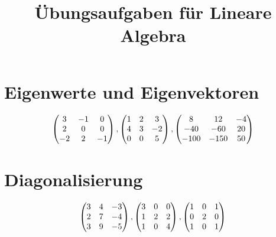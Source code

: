 \documentclass[ngerman,a4paper]{article}
\title{\textbf{\"Ubungsaufgaben f\"ur Lineare Algebra}}
\author{}
\date{}
\begin{document}
\maketitle

\renewcommand{\arraystretch}{1.5}

\section{Eigenwerte und Eigenvektoren}
\begin{align}
	\begin{pmatrix}
		3 & -1 & 0 \\ 2 & 0 & 0 \\ -2 & 2 & -1
	\end{pmatrix},
	\begin{pmatrix}
		1 & 2 & 3 \\ 4 & 3 & -2 \\ 0 & 0 & 5
	\end{pmatrix},
	\begin{pmatrix}
		8 & 12 & -4 \\ -40 & -60 & 20 \\ -100 & -150 & 50
	\end{pmatrix}\notag
\end{align}

\section{Diagonalisierung}
\begin{align}
	\begin{pmatrix}
		3 & 4 & -3 \\ 2 & 7 & -4 \\ 3 & 9 & -5
	\end{pmatrix},
	\begin{pmatrix}
		3 & 0 & 0 \\ 1 & 2 & 2 \\ 1 & 0 & 4
	\end{pmatrix},
	\begin{pmatrix}
		 1 & 0 & 1 \\ 0 & 2 & 0 \\ 1 & 0 & 1
	\end{pmatrix}\notag
\end{align}
\end{document}
